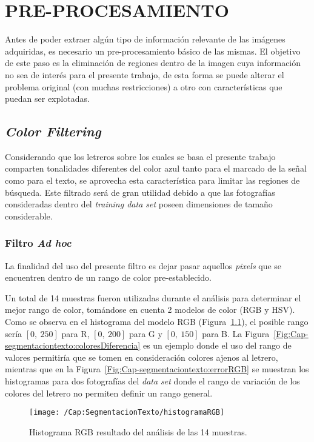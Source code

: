 \chapter{PRE-PROCESAMIENTO}
\label{cap-preprocesamiento}
\setcounter{secnumdepth}{0}
Antes de poder extraer algún tipo de información relevante de las imágenes
adquiridas, es necesario un pre-procesamiento básico de las mismas. El objetivo
de este paso es la eliminación de regiones dentro de la imagen cuya información
no sea de interés para el presente trabajo, de esta forma se puede alterar el
problema original (con muchas restricciones) a otro con características que
puedan ser explotadas.

\setcounter{secnumdepth}{3}
\section{\textit{Color Filtering}}
Considerando que los letreros sobre los cuales se basa el presente trabajo
comparten tonalidades diferentes del color azul tanto para el marcado de la
señal como para el texto, se aprovecha esta característica para limitar las
regiones de búsqueda. Este filtrado será de gran utilidad debido a que las
fotografías consideradas dentro del \textit{training data set} poseen
dimensiones de tamaño considerable.

\subsection{Filtro \textit{Ad hoc}}
La finalidad del uso del presente filtro es dejar pasar aquellos
\textit{pixels} que se encuentren dentro de un rango de color pre-establecido.

Un total de 14 muestras fueron utilizadas durante el análisis para determinar
el mejor rango de color, tomándose en cuenta 2 modelos de color (RGB y HSV).
Como se observa en el histograma del modelo RGB
(Figura~\ref{Fig:Cap-segmentaciontexto:HistogramaRGB}), el posible rango sería
$[0,~250]$ para R, $[0,~200]$ para G y $[0,~150]$ para B. La
Figura~\ref{Fig:Cap-segmentaciontexto:coloresDiferencia} es un ejemplo donde el
uso del rango de valores permitiría que se tomen en consideración colores ajenos
al letrero, mientras que en la Figura~\ref{Fig:Cap-segmentaciontexto:errorRGB}
se muestran los histogramas para dos fotografías del \textit{data set} donde el
rango de variación de los colores del letrero no permiten definir un rango
general.

\begin{figure}[h!]
	\texttt{[image: /Cap:SegmentacionTexto/histogramaRGB]}
	\caption{Histograma RGB resultado del análisis de las 14 muestras.}
	\label{Fig:Cap-segmentaciontexto:HistogramaRGB}
\end{figure}

